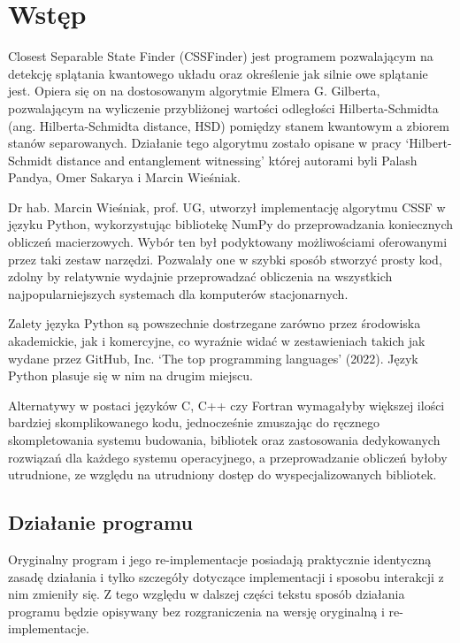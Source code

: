 \documentclass[11pt, a4paper]{article}
\begin{document}
  \begin{sloppypar}
    \section{Wstęp}
    Closest Separable State Finder (CSSFinder) jest programem pozwalającym na detekcję splątania
    kwantowego układu oraz określenie jak silnie owe splątanie jest. Opiera się on na
    dostosowanym algorytmie Elmera G. Gilberta\cite{Lindemann_Gilbert}, pozwalającym na wyliczenie
    przybliżonej wartości odległości Hilberta-Schmidta (ang. Hilberta-Schmidta distance,
    HSD) pomiędzy stanem kwantowym a zbiorem stanów separowanych. Działanie tego
    algorytmu zostało opisane w pracy `Hilbert-Schmidt distance and entanglement witnessing'
    której autorami byli Palash Pandya, Omer Sakarya i Marcin Wieśniak\cite{MW_Hilbert_Schmidt_distance}.

    Dr hab. Marcin Wieśniak, prof. UG, utworzył implementację algorytmu CSSF w języku
    Python, wykorzystując bibliotekę NumPy do przeprowadzania koniecznych obliczeń macierzowych.
    Wybór ten był podyktowany możliwościami oferowanymi przez taki zestaw narzędzi. Pozwalały
    one w szybki sposób stworzyć prosty kod, zdolny by relatywnie wydajnie przeprowadzać
    obliczenia na wszystkich najpopularniejszych systemach dla komputerów stacjonarnych.

    Zalety języka Python są powszechnie dostrzegane zarówno przez środowiska akademickie,
    jak i komercyjne, co wyraźnie widać w zestawieniach takich jak wydane przez GitHub, Inc.
    `The top programming languages' (2022)\cite{GitHub_Top_languages}. Język Python
    plasuje się w nim na drugim miejscu.

    Alternatywy w postaci języków C, C++ czy Fortran wymagałyby większej ilości bardziej
    skomplikowanego kodu, jednocześnie zmuszając do ręcznego skompletowania systemu
    budowania, bibliotek oraz zastosowania dedykowanych rozwiązań dla każdego systemu operacyjnego,
    a przeprowadzanie obliczeń byłoby utrudnione, ze względu na utrudniony dostęp do wyspecjalizowanych
    bibliotek.

    \subsection{Działanie programu}
    Oryginalny program i jego re-implementacje posiadają praktycznie identyczną zasadę działania
    i tylko szczegóły dotyczące implementacji i sposobu interakcji z nim zmieniły się. Z
    tego względu w dalszej części tekstu sposób działania programu będzie opisywany bez
    rozgraniczenia na wersję oryginalną i re-implementacje.


\end{sloppypar}
\end{document}
